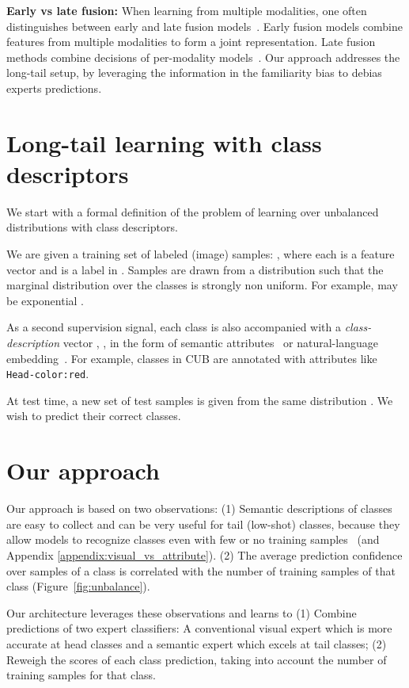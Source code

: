 \documentclass[10pt,twocolumn,letterpaper]{article}
\newcommand{\figref}[1]{Figure~\ref{#1}}
\begin{document}
\textbf{Early vs late fusion:}
When learning from multiple modalities, one often distinguishes between early and late fusion models~\cite{liu2018learn}. Early fusion models combine features from multiple modalities to form a joint representation. Late fusion methods combine decisions of per-modality models~\cite{Kahou2013CombiningMS,asvadi2018multimodal,pouyanfar2019multi}. Our approach addresses the long-tail setup, by leveraging the information in the familiarity bias to debias experts predictions. 


\section{Long-tail learning with class descriptors}
\label{sec:setup}
We start with a formal definition of the problem of learning over unbalanced distributions with class descriptors. 

We are given a training set of  labeled (image) samples: , where each  is a feature vector and  is a label in . Samples are drawn from a distribution  such that the marginal distribution over the classes  is strongly non uniform. For example,  may be exponential . 

As a second supervision signal, each class  is also accompanied with a  \textit{class-description} vector , , in the form of semantic attributes~\cite{DAP} or natural-language embedding~\cite{Reed,ZhuGAN,socher2013zero}. For example, classes in CUB \cite{CUB} are annotated with attributes like \texttt{Head-color:red}.

At test time, a new set of  test samples  is given from the same distribution . We wish to predict their correct classes.




\section{Our approach}
\label{sec:approach}

Our approach is based on two observations: (1) Semantic descriptions of classes are easy to collect and can be very useful for tail (low-shot) classes, because they allow models to recognize classes even with few or no training samples~\cite{DAP,xianCVPR,LAGO} (and Appendix \ref{appendix:visual_vs_attribute}).
(2) The average prediction confidence over samples of a class is correlated with the number of training samples of that class (\figref{fig:unbalance}). 

Our architecture leverages these observations and learns to (1) Combine predictions of two expert classifiers: A conventional visual expert which is more accurate at head classes and a semantic expert which excels at tail classes; (2) Reweigh the scores of each class prediction, taking into account the number of training samples for that class.
\end{document}
